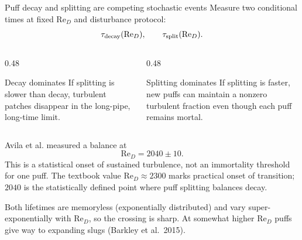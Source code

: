 \documentclass[aspectratio=169,11pt]{beamer}
\newcommand{\Rey}{\mathrm{Re}}
\begin{document}
\begin{frame}{Puff decay and splitting are competing stochastic events}
Measure two conditional times at fixed $\Rey_D$ and disturbance protocol:
\[
  \tau_{\rm decay}(\Rey_D),
  \qquad
  \tau_{\rm split}(\Rey_D).
\]

\begin{columns}[T,onlytextwidth]
\begin{column}{0.48\textwidth}
\begin{block}{Decay dominates}
If splitting is slower than decay, turbulent patches disappear in the long-pipe, long-time limit.
\end{block}
\end{column}
\begin{column}{0.48\textwidth}
\begin{block}{Splitting dominates}
If splitting is faster, new puffs can maintain a nonzero turbulent fraction even though each puff remains mortal.
\end{block}
\end{column}
\end{columns}

Avila et al. measured a balance at
\[
  \boxed{\Rey_D=2040\pm10.}
\]
This is a statistical onset of sustained turbulence, not an immortality threshold for one puff.
The textbook value $\Rey_D\approx2300$ marks practical onset of transition; $2040$ is the statistically defined point where puff splitting balances decay.
{\footnotesize Both lifetimes are memoryless (exponentially distributed) and vary super-exponentially with $\Rey_D$, so the crossing is sharp. At somewhat higher $\Rey_D$ puffs give way to expanding slugs (Barkley et al.\ 2015).\par}
\end{frame}
\end{document}
